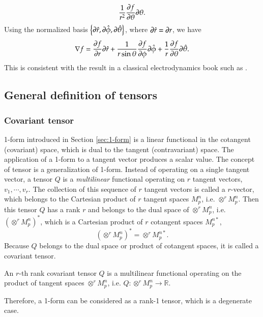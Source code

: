\documentclass[11pt, a4paper]{book}
\begin{document}
\begin{Example}
\begin{equation}
    \frac{1}{r^2} \frac{\partial f}{\partial \theta} \boldsymbol{\partial}\theta.
  \end{equation}
  Using the normalized basis
  $\left\{ \boldsymbol{\partial}\hat{r}, \boldsymbol{\partial}\hat{\phi}, \boldsymbol{\partial}\hat{\theta}
  \right\}$, where $\boldsymbol{\partial}\hat{r} = \boldsymbol{\partial}r$, we have
  \begin{equation}
    \nabla f = \frac{\partial f}{\partial r}\boldsymbol{\partial}\hat{r} + \frac{1}{r\sin\theta} \frac{\partial f}{\partial \phi} \boldsymbol{\partial}\hat{\phi} +
    \frac{1}{r} \frac{\partial f}{\partial \theta} \boldsymbol{\partial}\hat{\theta}.
  \end{equation}
  This is consistent with the result in a classical electrodynamics book such as
  \citep{GriffithsIntroduction1999}.
\end{Example}

\subsection{General definition of tensors}

\subsubsection{Covariant tensor}

1-form introduced in Section \ref{sec:1-form} is a linear functional in the cotangent
(covariant) space, which is dual to the tangent (contravariant) space. The application of
a 1-form to a tangent vector produces a scalar value. The concept of tensor is a
generalization of 1-form. Instead of operating on a single tangent vector, a tensor $Q$ is
a \emph{multilinear} functional operating on $r$ tangent vectors, $v_1, \cdots, v_r$. The
collection of this sequence of $r$ tangent vectors is called a $r$-vector, which belongs
to the Cartesian product of $r$ tangent spaces $M_p^n$, i.e. $\otimes^r M_p^n$. Then this
tensor $Q$ has a rank $r$ and belongs to the dual space of $\otimes^r M_p^n$, i.e.
$\left( \otimes^r M_p^n \right)^*$, which is a Cartesian product of $r$ cotangent spaces
$M_p^{n*}$,
\begin{equation}
  \left( \otimes^r M_p^n \right)^* = \otimes^r M_p^{n*}.
\end{equation}
Because $Q$ belongs to the dual space or product of cotangent spaces, it is called a
covariant tensor.

\begin{Definition}
  An $r$-th rank covariant tensor $Q$ is a multilinear functional operating on the product
  of tangent spaces $\otimes^r M_p^n$, i.e. $Q: \otimes^r M_p^n \rightarrow \mathbb{R}$.
\end{Definition}
Therefore, a 1-form can be considered as a rank-1 tensor, which is a degenerate case.
\end{document}
